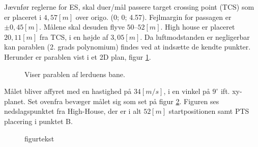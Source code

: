 Jævnfør reglerne for ES, skal duer/mål passere target crossing point (TCS) som er 
placeret i $4,57 [m]$ over origo. (0; 0; 4.57). Fejlmargin for passagen er $\pm0,45 [m]$. 
Målene skal desuden flyve $50 – 52 [m]$.  High house er placeret $20,11 [m]$ fra TCS, i en 
højde af $3,05 [m]$. Da luftmodstanden er negligerbar kan parablen (2. grads 
polynomium) findes ved at indsætte de kendte punkter. Herunder er parablen vist i et 
2D plan, figur \ref{fig:HH2D_para}.
\begin{figure}[!th]
\centering
\begin{tikzpicture}[scale=1]

\end{tikzpicture}
\caption[Lerdue parabel]{Viser parablen af lerduens bane.}
\label{fig:HH2D_para}
\end{figure}




Målet bliver affyret med en hastighed på $34 [m/s]$, i en vinkel på $9^{\circ}$ ift. xy-
planet. Set ovenfra bevæger målet sig som set på figur \ref{fig:para_in_xy_plane}. 
Figuren ses nedslagspunktet fra High-House, der er i alt $52 [m]$ startpositionen samt 
PTS placering i punktet B. 



\begin{figure}[!th]
\centering
\begin{tikzpicture}[scale=1]

\end{tikzpicture}
\caption[tekst i indholdsfortegnelsen]{figurtekst}
\label{fig:para_in_xy_plane}
\end{figure}

